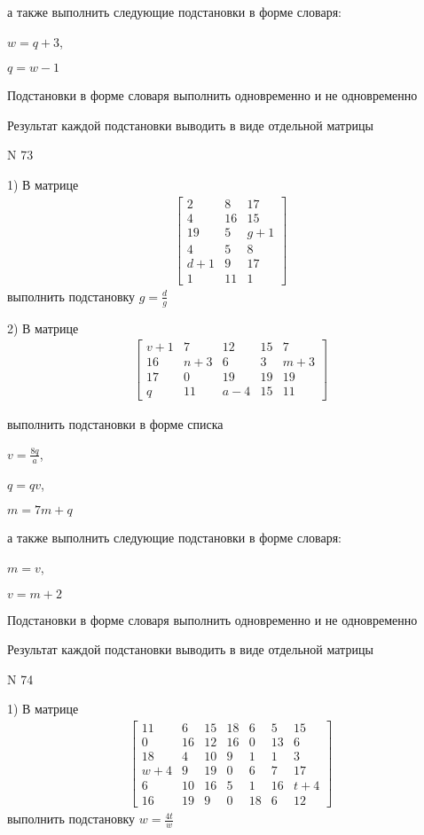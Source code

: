 \documentclass[11pt]{report}
\begin{document}
а также выполнить следующие подстановки в форме словаря:

$w=q + 3$,

$q=w - 1$


    Подстановки в форме словаря выполнить одновременно и не одновременно


    Результат каждой подстановки выводить в виде отдельной матрицы

\newpage
N 73


    1) В матрице
\begin{align*}
\left[\begin{matrix}2 & 8 & 17\\4 & 16 & 15\\19 & 5 & g + 1\\4 & 5 & 8\\d + 1 & 9 & 17\\1 & 11 & 1\end{matrix}\right]
\end{align*}
выполнить подстановку $g=\frac{d}{g}$


    2) В матрице
\begin{align*}
\left[\begin{matrix}v + 1 & 7 & 12 & 15 & 7\\16 & n + 3 & 6 & 3 & m + 3\\17 & 0 & 19 & 19 & 19\\q & 11 & a - 4 & 15 & 11\end{matrix}\right]
\end{align*}

выполнить подстановки в форме списка

$v=\frac{8 q}{a}$,

$q=q v$,

$m=7 m + q$

а также выполнить следующие подстановки в форме словаря:

$m=v$,

$v=m + 2$


    Подстановки в форме словаря выполнить одновременно и не одновременно


    Результат каждой подстановки выводить в виде отдельной матрицы

\newpage
N 74


    1) В матрице
\begin{align*}
\left[\begin{matrix}11 & 6 & 15 & 18 & 6 & 5 & 15\\0 & 16 & 12 & 16 & 0 & 13 & 6\\18 & 4 & 10 & 9 & 1 & 1 & 3\\w + 4 & 9 & 19 & 0 & 6 & 7 & 17\\6 & 10 & 16 & 5 & 1 & 16 & t + 4\\16 & 19 & 9 & 0 & 18 & 6 & 12\end{matrix}\right]
\end{align*}
выполнить подстановку $w=\frac{4 t}{w}$
\end{document}

